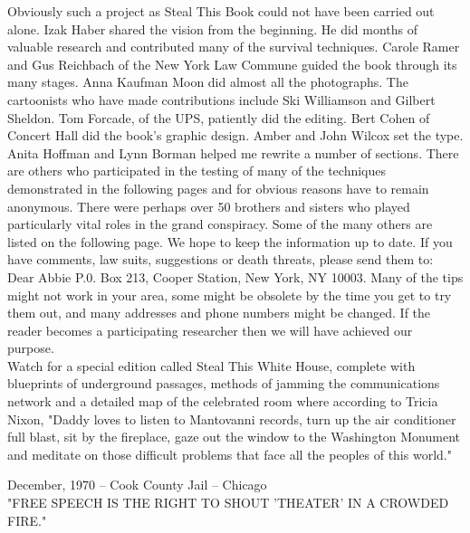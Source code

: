 \documentclass[11pt,twoside,a4paper]{book}
\begin{document}
Obviously such a project as Steal This Book could not have been carried out alone. Izak Haber shared the vision from the beginning. He did months of valuable research and contributed many of the survival techniques. Carole Ramer and Gus Reichbach of the New York Law Commune guided the book through its many stages. Anna Kaufman Moon did almost all the photographs. The cartoonists who have made contributions include Ski Williamson and Gilbert Sheldon. Tom Forcade, of the UPS, patiently did the editing. Bert Cohen of Concert Hall did the book's graphic design. Amber and John Wilcox set the type. Anita Hoffman and Lynn Borman helped me rewrite a number of sections. There are others who participated in the testing of many of the techniques demonstrated in the following pages and for obvious reasons have to remain anonymous. There were perhaps over 50 brothers and sisters who played particularly vital roles in the grand conspiracy. Some of the many others are listed on the following page. We hope to keep the information up to date. If you have comments, law suits, suggestions or death threats, please send them to: Dear Abbie P.0. Box 213, Cooper Station, New York, NY 10003. Many of the tips might not work in your area, some might be obsolete by the time you get to try them out, and many addresses and phone numbers might be changed. If the reader becomes a participating researcher then we will have achieved our purpose.~\\

Watch for a special edition called Steal This White House, complete with blueprints of underground passages, methods of jamming the communications network and a detailed map of the celebrated room where according to Tricia Nixon, "Daddy loves to listen to Mantovanni records, turn up the air conditioner full blast, sit by the fireplace, gaze out the window to the Washington Monument and meditate on those difficult problems that face all the peoples of this world."~\\

\clearpage

December, 1970 -- Cook County Jail -- Chicago~\\

"FREE SPEECH IS THE RIGHT TO SHOUT 'THEATER' IN A CROWDED FIRE." ~\\
\end{document}
